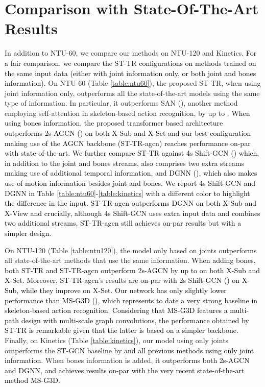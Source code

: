 \documentclass[times,twocolumn,final,authoryear]{elsarticle}
\DeclareRobustCommand{\new}[1]
{{\textcolor{black}{#1}}}
\begin{document}
\section{Comparison with State-Of-The-Art Results}\label{comparison}
In addition to NTU-60, we compare our methods on NTU-120 and Kinetics. \new{For a fair comparison, we compare the ST-TR configurations on methods trained on the same input data (either with joint information only, or both joint and bones information).}
On NTU-60 (Table \ref{table:ntu60}), the proposed ST-TR, when using joint information only, outperforms all the state-of-the-art models using the same type of information. In particular, it outperforms SAN (\cite{san}), another method employing self-attention in skeleton-based action recognition, by up to . \new{When using bones information, the proposed transformer based architecture outperforms 2s-AGCN (\cite{Shi2018TwoStreamAG}) on both X-Sub and X-Set and our best configuration making use of the AGCN backbone (ST-TR-agcn) reaches performance on-par with state-of-the-art. We further compare ST-TR against 4s Shift-GCN (\cite{shift}) which, in addition to the joint and bones streams, also comprises two extra streams making use of additional temporal information, and DGNN (\cite{dirgraph}), which also makes use of motion information besides joint and bones. We report 4s Shift-GCN and DGNN in Table \ref{table:ntu60}-\ref{table:kinetics} with a different color to highlight the difference in the input. ST-TR-agcn outperforms DGNN on both X-Sub and X-View and crucially, although 4s Shift-GCN uses extra input data and combines two additional streams, ST-TR-agcn still achieves on-par results but with a simpler design. }

On NTU-120 (Table \ref{table:ntu120}), the model only based on joints outperforms all state-of-the-art methods that use the same information. \new{When adding bones, both ST-TR and ST-TR-agcn outperform 2s-AGCN by up to  on both X-Sub and X-Set. Moreover, ST-TR-agcn's results are on-par with 2s Shift-GCN (\cite{shift}) on X-Sub, while they improve on X-Set. 
Our network has only slightly lower performance than MS-G3D (\cite{disent}), which represents to date a very strong baseline in skeleton-based action recognition. Considering that MS-G3D features a multi-path design with multi-scale graph convolutions, the performance obtained by ST-TR is remarkable given that the latter is based on a simpler backbone.}
Finally, on Kinetics (Table \ref{table:kinetics}), our model using only joints outperforms the ST-GCN baseline by  \new{and all previous methods using only joint information}. When bones information is added, \new{it outperforms both 2s-AGCN and DGNN, and achieves results on-par with the very recent state-of-the-art method MS-G3D.}  
\end{document}
